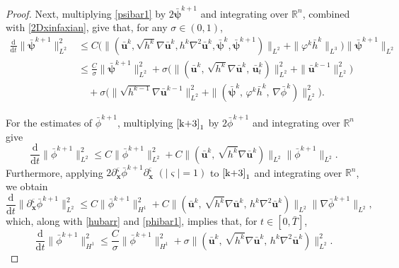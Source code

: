 \documentclass[10pt,a4paper]{amsart}
\begin{document}
\begin{proof}
Next, multiplying \eqref{psibar1} by $2\bar{\boldsymbol{\psi}}^{k+1}$ and integrating over $\mathbb{R}^n$, combined with \eqref{2Dxinfaxian}, give that, for any $\sigma\in (0,1)$,
\begin{equation}\label{psibar}
\begin{aligned}
\frac{\mathrm{d}}{\mathrm{d}t}\|\bar{\boldsymbol{\psi}}^{k+1}\|^2_{L^2}
&\leq C\big(\|(\bar{\boldsymbol{u}}^{k},\sqrt{h^k}\nabla \bar{\boldsymbol{u}}^{k},h^k\nabla^2\bar{\boldsymbol{u}}^k,\bar{\boldsymbol{\psi}}^k,\bar{\boldsymbol{\psi}}^{k+1})\|_{L^2}+\|\varphi^k\bar{h}^{k}\|_{L^3}\big)\|\bar{\boldsymbol{\psi}}^{k+1}\|_{L^2}\\
&\leq  \frac{C}{\sigma}\|\bar{\boldsymbol{\psi}}^{k+1}\|^2_{L^2}
+\sigma \big(\|(\bar{\boldsymbol{u}}^k,\,\sqrt{h^k}\nabla \bar{\boldsymbol{u}}^k,\,\bar{\boldsymbol{u}}^k_t)\|^2_{L^2}+\|\bar{\boldsymbol{u}}^{k-1}\|^2_{L^2}\big)\\
&\quad +\sigma\big(\|\sqrt{h^{k-1}}\nabla\bar{\boldsymbol{u}}^{k-1}\|^2_{L^2}
+\|(\bar{\boldsymbol{\psi}}^{k},\,\varphi^{k}\bar{h}^{k},\,\nabla \bar{\phi}^{k})\|^2_{L^2}\big).
\end{aligned}
\end{equation}
  

For the estimates of $\bar{\phi}^{k+1}$, multiplying $\eqref{k+3}_1$ by $2\bar{\phi}^{k+1}$ and integrating over $\mathbb{R}^n$ give 
\begin{equation}\label{phibar1}
\frac{\mathrm{d}}{\mathrm{d}t}\|\bar{\phi}^{k+1}\|^2_{L^2}\leq C\|\bar{\phi}^{k+1}\|^2_{L^2}
+C\|(\bar{\boldsymbol{u}}^{k},\,\sqrt{h^k}\nabla\bar{\boldsymbol{u}}^{k})\|_{L^2}\|\bar{\phi}^{k+1}\|_{L^2}.
\end{equation}
Furthermore, applying $2\partial^{\boldsymbol{\varsigma}}_{\boldsymbol{x}}\bar{\phi}^{k+1}\partial^{\boldsymbol{\varsigma}}_{\boldsymbol{x}}$ $(|\boldsymbol{\varsigma}|=1)$ to $\eqref{k+3}_1$  and  integrating over $\mathbb{R}^n$, we obtain 
\begin{equation*}
\frac{\mathrm{d}}{\mathrm{d}t}\|\partial^{\boldsymbol{\varsigma}}_{\boldsymbol{x}}\bar{\phi}^{k+1}\|^2_{L^2}\leq C\|\bar{\phi}^{k+1}\|^2_{H^1}+C\|(\bar{\boldsymbol{u}}^{k},\,\sqrt{h^k}\nabla\bar{\boldsymbol{u}}^{k},\,h^k\nabla^2\bar{\boldsymbol{u}}^{k})\|_{L^2}\|\nabla\bar{\phi}^{k+1}\|_{L^2},
\end{equation*}
which, along with \eqref{hubarr} and \eqref{phibar1}, implies that, for $t\in [0,\bar{T}]$,
\begin{equation}\label{phibar2}
\frac{\mathrm{d}}{\mathrm{d}t}\|\bar{\phi}^{k+1}\|^2_{H^1}\leq \frac{C}{\sigma}\|\bar{\phi}^{k+1}\|^2_{H^1
}+\sigma\|(\bar{\boldsymbol{u}}^{k},\,\sqrt{h^k}\nabla\bar{\boldsymbol{u}}^{k},\,h^k\nabla^2\bar{\boldsymbol{u}}^{k})\|^2_{L^2}.
\end{equation}






\end{proof}
\end{document}
